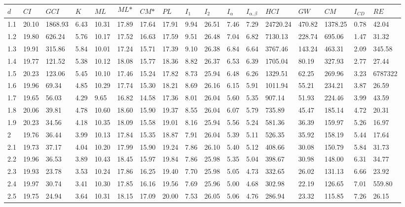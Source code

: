 \begin{adjustbox}{angle=90}
  \begin{center}
    \begin{tabular}{|l|llllllllllllllll|}
      \hline $d$ &
$\textit{CI}$&$\textit{GCI}$&$K$&$\textit{ML}$&$$\textit{ML*}$$&$\textit{CM*}$&$\textit{PL}$&$\textit{I}_1$&$\textit{I}_2$&$\textit{I}_{\alpha}$&$\textit{I}_{\alpha,\beta}$&$\textit{HCI}$&$\textit{GW}$&$\textit{CM}$&$\textit{I}_{CD}$&$\textit{RE}$\\ \hline \hline
1.1&20.10&1868.93&6.43&10.31&17.89&17.64&17.91&9.94&26.51&7.46&7.29&24720.24&470.82&1378.25&0.78&42.04  \\ 
1.2&19.80&626.24&5.76&10.17&17.52&16.63&17.59&9.51&26.48&7.04&6.82&7130.13&228.74&695.06&1.47&31.32  \\ 
1.3&19.91&315.86&5.84&10.01&17.24&15.71&17.39&9.10&26.38&6.84&6.64&3767.46&143.24&463.31&2.09&345.58  \\ 
1.4&19.77&121.52&5.38&10.12&18.08&15.77&18.36&8.82&26.37&6.53&6.39&1705.04&80.19&327.93&2.77&27.44  \\ 
1.5&20.23&123.06&5.45&10.10&17.46&15.24&17.82&8.73&25.94&6.48&6.26&1329.51&62.25&269.96&3.23&6787322  \\ 
1.6&19.96&69.34&4.85&10.29&17.74&15.30&18.21&8.69&26.16&6.15&5.91&1011.94&55.21&234.21&3.87&26.59  \\ 
1.7&19.65&56.03&4.29&9.65&16.82&14.58&17.36&8.01&26.04&5.60&5.35&907.14&51.93&224.46&3.99&43.59  \\ 
1.8&20.06&39.81&4.78&10.60&18.60&15.90&19.37&8.55&26.04&6.07&5.79&735.89&45.47&185.14&4.72&20.31  \\ 
1.9&20.23&34.56&4.18&10.35&18.09&15.58&19.01&8.16&25.94&5.56&5.24&581.36&36.39&159.97&5.26&16.97  \\ 
2&19.76&36.44&3.99&10.13&17.84&15.35&18.87&7.91&26.04&5.39&5.11&526.35&35.92&158.19&5.44&17.64  \\ 
2.1&19.73&37.17&4.04&10.20&17.99&15.90&19.24&7.86&26.10&5.40&5.12&408.66&30.08&150.79&5.84&31.73  \\ 
2.2&19.96&36.53&3.89&10.43&18.45&15.97&19.84&7.86&25.98&5.35&5.04&398.67&30.98&148.00&6.31&34.77  \\ 
2.3&19.93&23.78&3.53&10.24&17.86&16.25&19.40&7.70&25.98&5.05&4.73&332.65&26.02&131.13&6.66&23.92  \\ 
2.4&19.97&30.74&3.41&10.30&17.85&16.16&19.56&7.69&25.96&5.00&4.68&302.98&22.19&126.65&7.01&559.80  \\ 
2.5&19.75&24.94&3.64&10.31&18.15&17.09&20.00&7.53&26.05&5.06&4.76&286.94&23.32&115.85&7.26&26.15  \\ 

\end{tabular}
\end{center}
\end{adjustbox}
